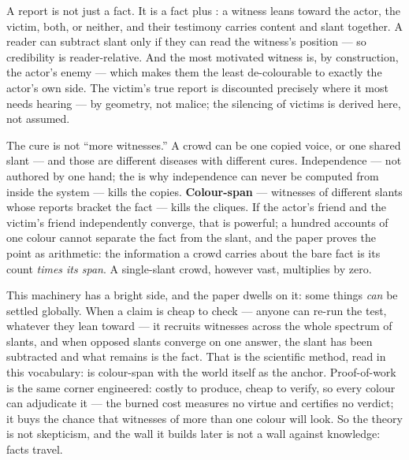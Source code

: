 \documentclass[../main_explainer]{subfiles}
\begin{document}
A report is not just a fact. It is a fact plus :
a witness leans toward the actor, the victim, both, or neither, and their testimony
carries content and slant together. A reader can subtract slant only if they can read
the witness's position --- so credibility is reader-relative. And the most motivated
witness is, by construction, the actor's enemy --- which makes them the least
de-colourable to exactly the actor's own side. The victim's true report is discounted
precisely where it most needs hearing --- by geometry, not malice; the silencing of
victims is derived here, not assumed.

The cure is not ``more witnesses.'' A crowd can be one copied voice, or one shared slant
--- and those are different diseases with different cures. Independence --- not authored
by one hand; the  is why independence can never be computed from inside the system --- kills
the copies. \textbf{Colour-span} --- witnesses of different slants whose reports bracket
the fact --- kills the cliques. If the actor's friend and the victim's friend
independently converge, that is powerful; a hundred accounts of one colour cannot
separate the fact from the slant, and the paper proves the point as arithmetic: the
information a crowd carries about the bare fact is its count \emph{times its span}. A
single-slant crowd, however vast, multiplies by zero.


This machinery has a bright side, and the paper dwells on it: some things \emph{can} be
settled globally. When a claim is cheap to check --- anyone can re-run the test,
whatever they lean toward --- it recruits witnesses across the whole spectrum of slants,
and when opposed slants converge on one answer, the slant has been subtracted and what
remains is the fact. That is the scientific method, read in this vocabulary:
 is colour-span with the world itself as the anchor. Proof-of-work is the same
corner engineered: costly to produce, cheap to verify, so every colour can adjudicate it
--- the burned cost measures no virtue and certifies no verdict; it buys the chance that
witnesses of more than one colour will look. So the theory is not skepticism, and the
wall it builds later is not a wall against knowledge: facts travel.
\end{document}
